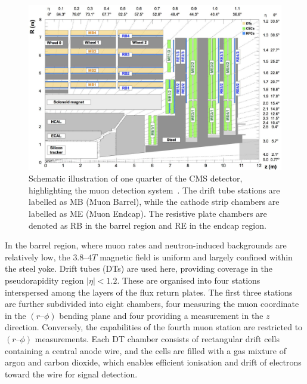 \begin{figure}[h]
\centering
\includegraphics[width= 1.0\textwidth]{Figures/Chapter3/CMS_Muon_System.pdf}
\caption{Schematic illustration of one quarter of the CMS detector, highlighting the muon detection system~\cite{CMS_Muon_System_Performance}. The drift tube stations are labelled as MB (Muon Barrel), while the cathode strip chambers are labelled as ME (Muon Endcap). The resistive plate chambers are denoted as RB in the barrel region and RE in the endcap region.}
\label{Figure:Chapter3_CMS_Muon_System}
\end{figure}

In the barrel region, where muon rates and neutron-induced backgrounds are relatively low, the $3.8–4\unit{T}$ magnetic field is uniform and largely confined within the steel yoke. Drift tubes (DTs) are used here, providing coverage in the pseudorapidity region $|\eta| < 1.2$. These are organised into four stations interspersed among the layers of the flux return plates. The first three stations are further subdivided into eight chambers, four measuring the muon coordinate in the $(r–\phi)$ bending plane and four providing a measurement in the $z$ direction. Conversely, the capabilities of the fourth muon station are restricted to $(r–\phi)$ measurements. Each DT chamber consists of rectangular drift cells containing a central anode wire, and the cells are filled with a gas mixture of argon and carbon dioxide, which enables efficient ionisation and drift of electrons toward the wire for signal detection. 

